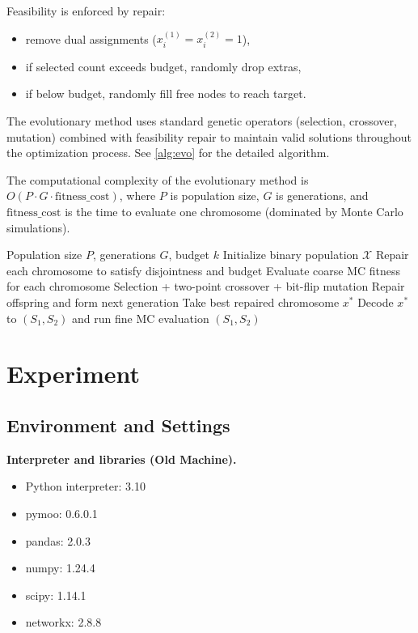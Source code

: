 \documentclass[onecolumn,a4paper,12pt]{IEEEtran}
\begin{document}
Feasibility is enforced by repair:
\begin{itemize}
        \item remove dual assignments ($x_i^{(1)}=x_i^{(2)}=1$),
        \item if selected count exceeds budget, randomly drop extras,
        \item if below budget, randomly fill free nodes to reach target.
\end{itemize}

The evolutionary method uses standard genetic operators (selection, crossover, mutation) combined with feasibility repair to maintain valid solutions throughout the optimization process. See \ref{alg:evo} for the detailed algorithm.

The computational complexity of the evolutionary method is $O(P \cdot G \cdot \text{fitness\_cost})$, where $P$ is population size, $G$ is generations, and $\text{fitness\_cost}$ is the time to evaluate one chromosome (dominated by Monte Carlo simulations).

\begin{algorithm}[h]
\caption{Binary GA for IEM}
\label{alg:evo}
\begin{algorithmic}[1]
\Require Population size $P$, generations $G$, budget $k$
\State Initialize binary population $\mathcal{X}$
                \State Repair each chromosome to satisfy disjointness and budget
                \State Evaluate coarse MC fitness for each chromosome
                \State Selection + two-point crossover + bit-flip mutation
                \State Repair offspring and form next generation
\EndFor
\State Take best repaired chromosome $x^*$
\State Decode $x^*$ to $(S_1,S_2)$ and run fine MC evaluation
\State \Return $(S_1,S_2)$
\end{algorithmic}
\end{algorithm}

\section{Experiment}

\subsection{Environment and Settings}
\textbf{Interpreter and libraries (Old Machine).}
\begin{itemize}
        \item Python interpreter: 3.10
        \item pymoo: 0.6.0.1
        \item pandas: 2.0.3
        \item numpy: 1.24.4
        \item scipy: 1.14.1
        \item networkx: 2.8.8
\end{itemize}
\end{document}
